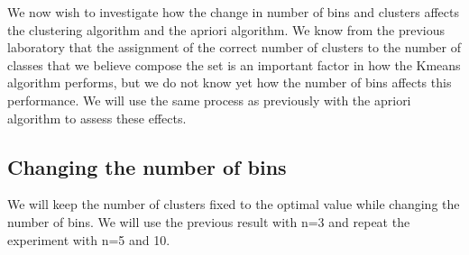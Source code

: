 \documentclass[letterpaper,12pt]{article}
\begin{document}
We now wish to investigate how the change in number of bins and clusters affects the clustering algorithm and the apriori algorithm. We know from the previous laboratory that the assignment of the correct number of clusters to the number of classes that we believe compose the set is an important factor in how the Kmeans algorithm performs, but we do not know yet how the number of bins affects this performance. We will use the same process as previously with the apriori algorithm to assess these effects.

\subsection{Changing the number of bins}

We will keep the number of clusters fixed to the optimal value while changing the number of bins. We will use the previous result with n=3 and repeat the experiment with n=5 and 10.
\end{document}
